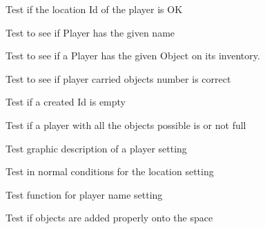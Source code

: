 \begin{DoxyRefList}
\item[\label{test__test000195}%
\hypertarget{test__test000195}{}%
Member \hyperlink{player__test_8h_a408a557a0cff748c10fb9a03445af191}{test1\+\_\+player\+\_\+get\+\_\+location} ()]Test if the location Id of the player is OK  
\item[\label{test__test000183}%
\hypertarget{test__test000183}{}%
Member \hyperlink{player__test_8h_a94068667d8faa66a4ad293dd2c60f2ef}{test1\+\_\+player\+\_\+get\+\_\+name} ()]Test to see if Player has the given name  
\item[\label{test__test000189}%
\hypertarget{test__test000189}{}%
Member \hyperlink{player__test_8h_a53eb6ee101f01fe988c5da03129d2e2f}{test1\+\_\+player\+\_\+get\+\_\+object} ()]Test to see if a Player has the given Object on its inventory.  
\item[\label{test__test000191}%
\hypertarget{test__test000191}{}%
Member \hyperlink{player__test_8h_af1b1a4517ec347b3b953c9fc9b3ea1a5}{test1\+\_\+player\+\_\+get\+\_\+objects\+\_\+number} ()]Test to see if player carried objects number is correct  
\item[\label{test__test000202}%
\hypertarget{test__test000202}{}%
Member \hyperlink{player__test_8h_a9e7594fd2a1016abea94e0b88016d6ec}{test1\+\_\+player\+\_\+is\+\_\+empty} ()]Test if a created Id is empty  
\item[\label{test__test000205}%
\hypertarget{test__test000205}{}%
Member \hyperlink{player__test_8h_a2c7a96147ce996da70dce4b4cb37ecef}{test1\+\_\+player\+\_\+is\+\_\+full} ()]Test if a player with all the objects possible is or not full  
\item[\label{test__test000177}%
\hypertarget{test__test000177}{}%
Member \hyperlink{player__test_8h_adfd8f1d4fd7d500f9b5236db4e697ea3}{test1\+\_\+player\+\_\+set\+\_\+graphic\+\_\+description} ()]Test graphic description of a player setting  
\item[\label{test__test000180}%
\hypertarget{test__test000180}{}%
Member \hyperlink{player__test_8h_aec6799a4f46c3f3c471fcb668addcad4}{test1\+\_\+player\+\_\+set\+\_\+location} ()]Test in normal conditions for the location setting  
\item[\label{test__test000174}%
\hypertarget{test__test000174}{}%
Member \hyperlink{player__test_8h_a9d87c09e6af910d695265e3fd77ae3a2}{test1\+\_\+player\+\_\+set\+\_\+name} ()]Test function for player name setting  
\item[\label{test__test000253}%
\hypertarget{test__test000253}{}%
Member \hyperlink{space__test_8h_afe51f379fb29f8e96f9f034df991de30}{test1\+\_\+space\+\_\+add\+\_\+object} ()]Test if objects are added properly onto the space  

\end{DoxyRefList}
